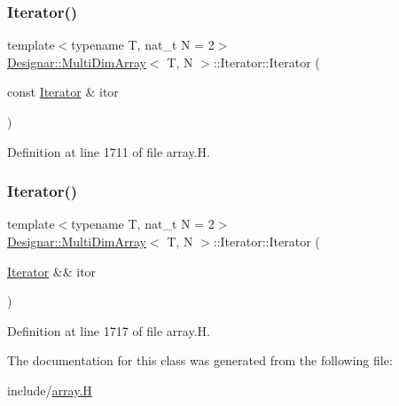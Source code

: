 \mbox{\label{class_designar_1_1_multi_dim_array_1_1_iterator_a2d0c217ae08b2203c50e1d1a01c3af40}} 
\subsubsection{\texorpdfstring{Iterator()}{Iterator()}\hspace{0.1cm}{\footnotesize\ttfamily [4/5]}}
{\footnotesize\ttfamily template$<$typename T, nat\+\_\+t N = 2$>$ \\
\hyperlink{class_designar_1_1_multi_dim_array}{Designar\+::\+Multi\+Dim\+Array}$<$ T, N $>$\+::Iterator\+::\+Iterator (\begin{DoxyParamCaption}\item[{const \hyperlink{class_designar_1_1_multi_dim_array_1_1_iterator}{Iterator} \&}]{itor }\end{DoxyParamCaption})\hspace{0.3cm}{\ttfamily [inline]}}



Definition at line 1711 of file array.\+H.

\mbox{\label{class_designar_1_1_multi_dim_array_1_1_iterator_af6ebf97caae786b50dcb6062b3ab7b0b}} 
\subsubsection{\texorpdfstring{Iterator()}{Iterator()}\hspace{0.1cm}{\footnotesize\ttfamily [5/5]}}
{\footnotesize\ttfamily template$<$typename T, nat\+\_\+t N = 2$>$ \\
\hyperlink{class_designar_1_1_multi_dim_array}{Designar\+::\+Multi\+Dim\+Array}$<$ T, N $>$\+::Iterator\+::\+Iterator (\begin{DoxyParamCaption}\item[{\hyperlink{class_designar_1_1_multi_dim_array_1_1_iterator}{Iterator} \&\&}]{itor }\end{DoxyParamCaption})\hspace{0.3cm}{\ttfamily [inline]}}



Definition at line 1717 of file array.\+H.



The documentation for this class was generated from the following file\+:\begin{DoxyCompactItemize}
\item 
include/\hyperlink{array_8_h}{array.\+H}\end{DoxyCompactItemize}

